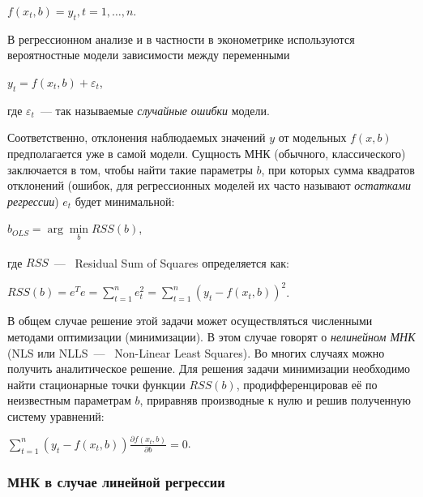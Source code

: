 \documentclass[a4paper]{article}
\begin{document}
{{{{{{{{\begin{center}
 {{\(f(x_{t},b) = y_{t},t = 1,\ldots,n\)}}.
\end{center}


В регрессионном анализе и в частности в эконометрике используются
вероятностные модели зависимости между переменными

\begin{center}
 {{\(y_{t} = f(x_{t},b) + \varepsilon_{t}\)}},
\end{center}

где {{\(\varepsilon_{t}\)}}~--- так называемые \emph{случайные ошибки}
модели.

Соответственно, отклонения наблюдаемых значений {{\(y\)}} от модельных
{{\(f(x,b)\)}} предполагается уже в самой модели. Сущность МНК
(обычного, классического) заключается в том, чтобы найти такие параметры
{{\(b\)}}, при которых сумма квадратов отклонений (ошибок, для
регрессионных моделей их часто называют \emph{остатками регрессии})
{{\(e_{t}\)}} будет минимальной:

\begin{center}
 {{\({\hat{b}}_{OLS} = \arg\min\limits_{b}RSS(b)\)}},
\end{center}

где {{\(RSS\)}}~--- ~\foreignlanguage{english}{Residual Sum of
Squares}\textsuperscript{} определяется как:

\begin{center}
 {{\(RSS(b) = e^{T}e = \sum\limits_{t = 1}^{n}e_{t}^{2} = \sum\limits_{t = 1}^{n}(y_{t} - f(x_{t},b))^{2}\)}}.
\end{center}

В общем случае решение этой задачи может осуществляться численными
методами оптимизации (минимизации). В этом случае говорят о
\emph{нелинейном МНК} (NLS или NLLS~---
~\foreignlanguage{english}{Non-Linear Least Squares}). Во многих случаях
можно получить аналитическое решение. Для решения задачи минимизации
необходимо найти стационарные точки функции {{\(RSS(b)\)}},
продифференцировав её по неизвестным параметрам {{\(b\)}}, приравняв
производные к нулю и решив полученную систему уравнений:

\begin{center}
 {{\(\sum\limits_{t = 1}^{n}(y_{t} - f(x_{t},b))\frac{\partial f(x_{t},b)}{\partial b} = 0\)}}.
\end{center}

\subsubsection{МНК в случае линейной регрессии}

}}}}}}}}
\end{document}
